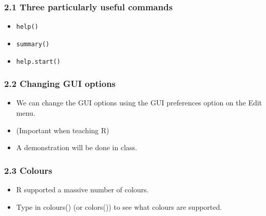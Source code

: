 \documentclass{beamer}
\begin{document}
 	\begin{frame}
 		\frametitle{2.1 Three particularly useful commands}
 		
 		\begin{itemize}
 			\item \texttt{help()}
 			\item \texttt{summary()}
 			\item \texttt{help.start()}
 		\end{itemize}
 		
 	\end{frame}
 	\begin{frame}
 		\frametitle{2.2 Changing GUI options}
 		\begin{itemize}
 			\item We can change the GUI options using the GUI preferences option on the Edit menu.
 			\item  (Important
 			when teaching R) 
 			\item A demonstration will be done in class.
 		\end{itemize}
 		
 	\end{frame}
 	\begin{frame}
 		\frametitle{2.3 Colours}
 		\begin{itemize}
 			\item R supported a massive number of colours.
 			\item Type in colours() (or colors()) to see what colours
 			are supported.
 		\end{itemize}
 	\end{frame}
 	
\end{document}
